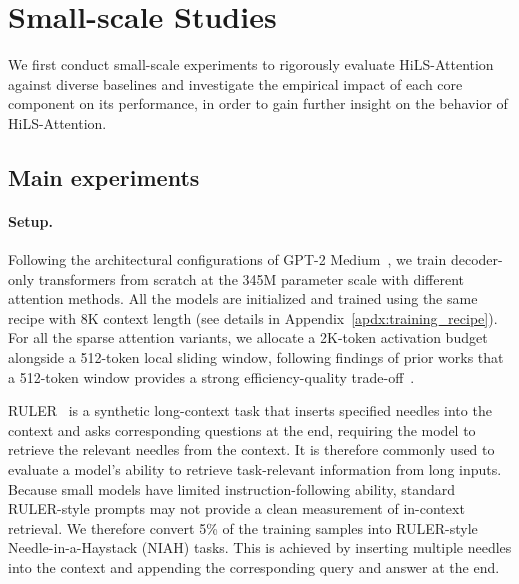 \section{Small-scale  Studies}
We first conduct small-scale experiments to rigorously evaluate HiLS-Attention against diverse baselines and investigate the empirical impact of each core component on its performance, in order to gain further insight on the behavior of HiLS-Attention.

\subsection{Main experiments}\label{sec:small_scale_exp}

\paragraph{Setup.}

Following the architectural configurations of GPT-2 Medium~\citep{radford2019language}, we train decoder-only transformers from scratch at the 345M parameter scale with different attention methods. All the models are initialized and trained using the same recipe with 8K context length (see details in Appendix~\ref{apdx:training_recipe}). For all the sparse attention variants, we allocate a 2K-token activation budget alongside a 512-token local sliding window, following findings of prior works that a 512-token window provides a strong efficiency-quality trade-off~\cite{wang2025rattentionminimalslidingwindow}.

RULER~\citep{hsieh2024ruler} is a synthetic long-context task that inserts specified needles into the context and asks corresponding questions at the end, requiring the model to retrieve the relevant needles from the context. It is therefore commonly used to evaluate a model's ability to retrieve task-relevant information from long inputs.
Because small models have limited instruction-following ability, standard RULER-style prompts may not 
provide a clean measurement of in-context retrieval. We therefore convert 5\% of the training samples into RULER-style Needle-in-a-Haystack (NIAH) tasks. This is achieved by inserting multiple needles into the context and appending the corresponding query and answer at the end. 

